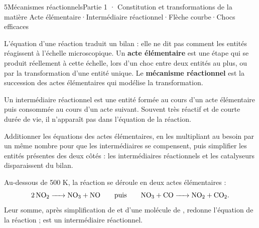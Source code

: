 \begin{ouverture}[mecanisme]{5}{Mécanismes réactionnels}{Partie 1 · Constitution et transformations de la matière}
{Acte élémentaire\enspace·\enspace Intermédiaire réactionnel\enspace·\enspace Flèche courbe\enspace·\enspace Chocs efficaces}
\end{ouverture}
\essentiel
{}
\begin{definition}
L'équation d'une réaction traduit un bilan : elle ne dit pas comment les entités réagissent à l'échelle
microscopique. Un \textbf{acte élémentaire} est une étape qui se produit réellement à cette échelle, lors d'un choc
entre deux entités au plus, ou par la transformation d'une entité unique. Le \textbf{mécanisme réactionnel} est la
succession des actes élémentaires qui modélise la transformation.
\end{definition}
\begin{definition}
Un intermédiaire réactionnel est une entité formée au cours d'un acte élémentaire puis consommée au cours d'un acte
suivant. Souvent très réactif et de courte durée de vie, il n'apparaît pas dans l'équation de la réaction.
\end{definition}
\begin{savoirfaire}
Additionner les équations des actes élémentaires, en les multipliant au besoin par un même nombre pour que les
intermédiaires se compensent, puis simplifier les entités présentes des deux côtés : les intermédiaires réactionnels
et les catalyseurs disparaissent du bilan.
\end{savoirfaire}
\begin{exemple}
Au-dessous de 500 K, la réaction  se déroule en deux actes élémentaires :
\[\ce{2 NO2 -> NO3 + NO}\qquad\text{puis}\qquad\ce{NO3 + CO -> NO2 + CO2}.\]
Leur somme, après simplification de  et d'une molécule de , redonne l'équation de la réaction ;
 est un intermédiaire réactionnel.
\end{exemple}
